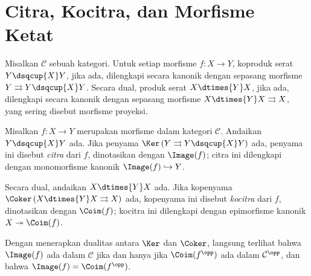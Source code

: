
\section{Citra, Kocitra, dan Morfisme Ketat}\label{sec:images}
\hypertarget{o014.aljabr2.chapter1.images-coimages-strict}{ }

Misalkan $\mathcal{C}$ sebuah kategori. Untuk setiap morfisme $f: X \to Y$,
koproduk serat $Y \dsqcup{X} Y$, jika ada, dilengkapi secara kanonik dengan
sepasang morfisme $Y \rightrightarrows Y \dsqcup{X} Y$. Secara dual, produk
serat $X \dtimes{Y} X$, jika ada, dilengkapi secara kanonik dengan sepasang
morfisme $X \dtimes{Y} X \rightrightarrows X$, yang sering disebut morfisme
proyeksi.

\begin{definisi}\label{def:Im-Coim}
	 
	 
	Misalkan $f: X \to Y$ merupakan morfisme dalam kategori $\mathcal{C}$.
	Andaikan $Y \dsqcup{X} Y$ ada. Jika penyama
	$\Ker\left( Y \rightrightarrows Y \dsqcup{X} Y\right)$ ada, penyama ini
	disebut \emph{citra} dari $f$, dinotasikan dengan $\Image(f)$; citra ini
	dilengkapi dengan monomorfisme kanonik $\Image(f) \hookrightarrow Y$.

	Secara dual, andaikan $X \dtimes{Y} X$ ada. Jika kopenyama
	$\Coker\left( X \dtimes{Y} X \rightrightarrows X \right)$ ada, kopenyama
	ini disebut \emph{kocitra} dari $f$, dinotasikan dengan $\Coim(f)$; kocitra
	ini dilengkapi dengan epimorfisme kanonik
	$X \twoheadrightarrow\Coim(f)$.
\end{definisi}

\begin{catatan}\label{rem:im-coim-duality}
	Dengan menerapkan dualitas antara $\Ker$ dan $\Coker$, langsung terlihat
	bahwa $\Image(f)$ ada dalam $\mathcal{C}$ jika dan hanya jika
	$\Coim(f^{\opp})$ ada dalam $\mathcal{C}^{\opp}$, dan bahwa
	$\Image(f) = \Coim(f^{\opp})$.
\end{catatan}

